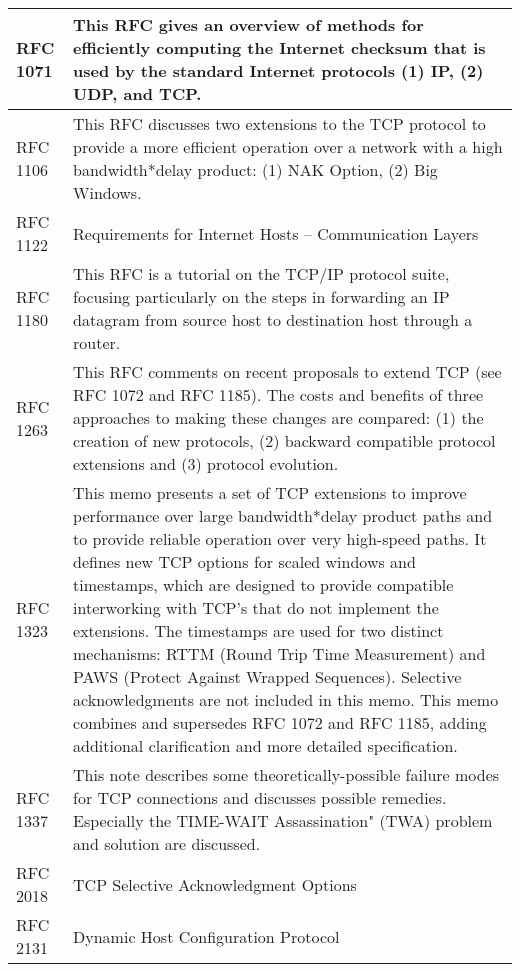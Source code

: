 \begin{longtable}{ | l | p{13cm} | }
RFC 1071 &
This RFC gives an overview of methods for efficiently computing the Internet checksum that is used by the standard Internet protocols (1) IP, (2) UDP, and TCP. \\ \hline

RFC 1106 &
This RFC discusses two extensions to the TCP protocol to provide a more efficient operation over a network with a high bandwidth*delay product: (1) NAK Option, (2) Big Windows. \\ \hline
 
RFC 1122 &
Requirements for Internet Hosts -- Communication Layers \\ \hline

RFC 1180 &
This RFC is a tutorial on the TCP/IP protocol suite, focusing  particularly on the steps in forwarding an IP datagram from source host to destination host through a router. \\ \hline

RFC 1263 &
This RFC comments on recent proposals to extend TCP (see RFC 1072 and RFC 1185). The costs and benefits of three approaches to making these changes are compared: (1) the creation of new protocols, (2) backward compatible protocol extensions and (3) protocol evolution. \\ \hline

RFC 1323 &
This memo presents a set of TCP extensions to improve performance over large bandwidth*delay product paths and to provide reliable operation over very high-speed paths. It defines new TCP options for scaled windows and timestamps, which are designed to provide compatible interworking with TCP's that do not implement the extensions.  The timestamps are used for two distinct mechanisms: RTTM (Round Trip Time Measurement) and PAWS (Protect Against Wrapped Sequences).  Selective acknowledgments are not included in this memo.
This memo combines and supersedes RFC 1072 and RFC 1185, adding additional clarification and more detailed specification. \\ \hline

RFC 1337 &
This note describes some theoretically-possible failure modes for TCP connections and discusses possible remedies. Especially the TIME-WAIT Assassination" (TWA) problem and solution are discussed. \\ \hline

RFC 2018 &
TCP Selective Acknowledgment Options \\ \hline

RFC 2131 &
Dynamic Host Configuration Protocol \\ \hline


\end{longtable}
